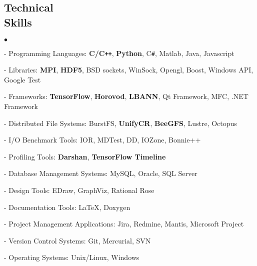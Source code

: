 \documentclass[margin,line]{res}
\newenvironment{list2}{
  \begin{list}{$\bullet$}{%
      \setlength{\itemsep}{0in}
      \setlength{\parsep}{0in} \setlength{\parskip}{0in}
      \setlength{\topsep}{0in} \setlength{\partopsep}{0in} 
      \setlength{\leftmargin}{0.2in}}}{\end{list}}
\begin{document}
\begin{resume}
\section{\sc Technical \\Skills}
\begin{list2}
\item[ - ] Programming Languages: {\bf C/C\texttt{++}}, {\bf Python}, C\texttt{\#}, Matlab, Java, Javascript
\item[ - ] Libraries: {\bf MPI}, {\bf HDF5}, BSD sockets, WinSock, Opengl, Boost, Windows API, Google Test
\item[ - ] Frameworks: {\bf TensorFlow}, {\bf Horovod}, {\bf LBANN}, Qt Framework, MFC, .NET Framework
\item[ - ] Distributed File Systems: BurstFS, {\bf UnifyCR}, {\bf BeeGFS}, Lustre, Octopus
\item[ - ] I/O Benchmark Tools: IOR, MDTest, DD, IOZone, Bonnie++
\item[ - ] Profiling Tools: {\bf Darshan}, {\bf TensorFlow Timeline}
\item[ - ] Database Management Systems: MySQL, Oracle, SQL Server
\item[ - ] Design Tools: EDraw, GraphViz, Rational Rose
\item[ - ] Documentation Tools: \LaTeX, Doxygen
\item[ - ] Project Management Applications: Jira, Redmine, Mantis, Microsoft Project
\item[ - ] Version Control Systems: Git, Mercurial, SVN
\item[ - ] Operating Systems: Unix/Linux, Windows
\end{list2}

\vspace*{-.1in}


\end{resume}
\end{document}
